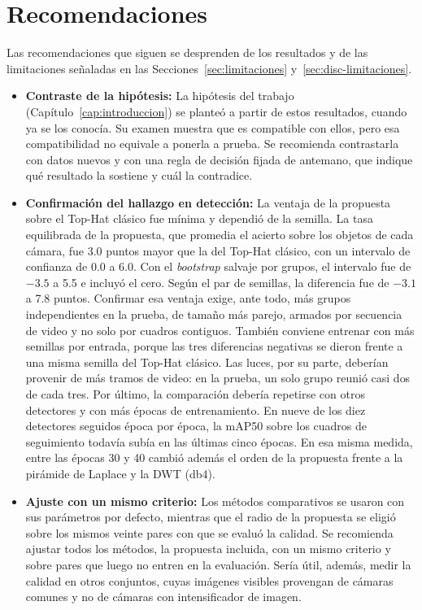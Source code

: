 \chapter{Recomendaciones}
\label{cap:recomendaciones}

Las recomendaciones que siguen se desprenden de los resultados y de las limitaciones señaladas en las
Secciones~\ref{sec:limitaciones} y~\ref{sec:disc-limitaciones}.

\begin{itemize}
\item \textbf{Contraste de la hipótesis:} La hipótesis del trabajo (Capítulo~\ref{cap:introduccion}) se
planteó a partir de estos resultados, cuando ya se los conocía. Su examen muestra que es compatible con
ellos, pero esa compatibilidad no equivale a ponerla a prueba. Se recomienda contrastarla con datos
nuevos y con una regla de decisión fijada de antemano, que indique qué resultado la sostiene y cuál la
contradice.

\item \textbf{Confirmación del hallazgo en detección:} La ventaja de la propuesta sobre el Top-Hat
clásico fue mínima y dependió de la semilla. La tasa equilibrada de la propuesta, que promedia el acierto
sobre los objetos de cada cámara, fue 3.0 puntos mayor que la del Top-Hat clásico, con un intervalo de
confianza de 0.0 a 6.0. Con el \textit{bootstrap} salvaje por grupos, el intervalo fue de $-3.5$ a 5.5
e incluyó el cero. Según el par de semillas, la diferencia fue de $-3.1$ a 7.8 puntos. Confirmar esa
ventaja exige, ante todo, más grupos independientes en la prueba, de tamaño más parejo, armados por
secuencia de video y no solo por cuadros contiguos.
También conviene entrenar con más semillas por entrada, porque las tres diferencias negativas se dieron
frente a una misma semilla del Top-Hat clásico. Las luces, por su parte, deberían provenir de más tramos
de video: en la prueba, un solo grupo reunió casi dos de cada tres. Por último, la comparación debería
repetirse con otros detectores y con más épocas de entrenamiento. En nueve de los diez detectores
seguidos época por época, la mAP50 sobre los cuadros de seguimiento todavía subía en
las últimas cinco épocas. En esa misma medida, entre las épocas 30 y 40 cambió además el orden de la propuesta frente a la
pirámide de Laplace y la DWT (db4).

\item \textbf{Ajuste con un mismo criterio:} Los métodos comparativos se usaron con sus parámetros por
defecto, mientras que el radio de la propuesta se eligió sobre los mismos veinte pares con que se evaluó
la calidad. Se recomienda ajustar todos los métodos, la propuesta incluida, con un mismo criterio y
sobre pares que luego no entren en la evaluación. Sería útil, además, medir la calidad en otros
conjuntos, cuyas imágenes visibles provengan de cámaras comunes y no de cámaras con intensificador de
imagen.


\end{itemize}
